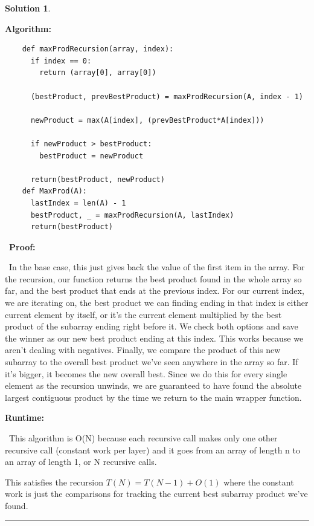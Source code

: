 \documentclass{article}
\theoremstyle{definition}
\def\fline{\rule{0.75\linewidth}{0.5pt}}
\newcommand{\finishline}{
  \begin{center}\fline
\end{center}}
\newtheorem*{solution*}{Solution}
\newenvironment{solution}{
\begin{solution*}}{{\finishline}
\end{solution*}}
\begin{document}
\begin{solution}
\

\textbf{Algorithm:}
\

  \begin{verbatim}
    def maxProdRecursion(array, index):
      if index == 0:
        return (array[0], array[0])

      (bestProduct, prevBestProduct) = maxProdRecursion(A, index - 1)

      newProduct = max(A[index], (prevBestProduct*A[index]))

      if newProduct > bestProduct:
        bestProduct = newProduct

      return(bestProduct, newProduct)
    def MaxProd(A):
      lastIndex = len(A) - 1
      bestProduct, _ = maxProdRecursion(A, lastIndex)
      return(bestProduct)
  \end{verbatim}
\
\textbf{Proof:}

\
In the base case, this just gives back the value of the first item in the array.
For the recursion, our function returns the best product found in the whole array so far, and the best product that ends at the previous index.
For our current index, we are iterating on, the best product we can finding ending in that index is either current element by itself, or it's the current element multiplied by the best product of the subarray
ending right before it. We check both options and save the winner as our new best product ending at this index. This works because we aren't dealing with negatives.
Finally, we compare the product of this new subarray to the overall best product we've seen anywhere in the array so far.
If it's bigger, it becomes the new overall best. Since we do this for every single element as the recursion unwinds,
we are guaranteed to have found the absolute largest contiguous product by the time we return to the main wrapper function.

\textbf{Runtime:}

\
This algorithm is O(N) because each recursive call makes only one other recursive call (constant work per layer) and it goes from an array of length n to an array of length 1, or N recursive calls.

This satisfies the recursion $T(N) = T(N-1) + O(1)$ where the constant work is just the comparisons for tracking the current best subarray product we've found.
\end{solution}

\newpage
\end{document}
